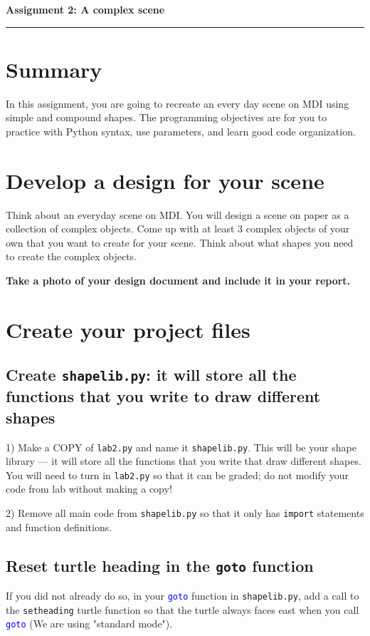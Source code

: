 \documentclass[12pt]{article}
\begin{document}
\begin{center}
  {\Large {\bf Assignment 2: A complex scene}}
  
\end{center}

\vspace{5pt}
\hrule
\vspace{5pt}

\section{Summary}
In this assignment, you are going to recreate an every day scene on MDI using simple and compound shapes.
The programming objectives are for you to practice with Python syntax, use parameters, and learn good code organization. 

\section{Develop a design for your scene}
Think about an everyday scene on MDI. You will design a scene on paper as a collection of complex objects. Come up with at least 3 complex objects of your own that you want to create for your scene. Think about what shapes you need to create the complex objects.

\textbf{Take a photo of your design document and include it in your report.} 

\section{Create your project files}
\subsection{Create \texttt{shapelib.py}: it will store all the functions that you write to draw different shapes}
1) Make a COPY of \texttt{lab2.py} and name it \texttt{shapelib.py}. This will be your shape library — it will store all the functions that you write that draw different shapes. You will need to turn in \texttt{lab2.py} so that it can be graded; do not modify your code from lab without making a copy!

2) Remove all main code from \texttt{shapelib.py} so that it only has \texttt{import} statements and function definitions.


\subsection{Reset turtle heading in the \texttt{goto} function}
If you did not already do so, in your \textcolor{blue}{\texttt{goto}} function in \texttt{shapelib.py}, add a call to the \texttt{setheading} turtle function so that the turtle always faces east when you call \textcolor{blue}{\texttt{goto}} (We are using "standard mode").
\end{document}
